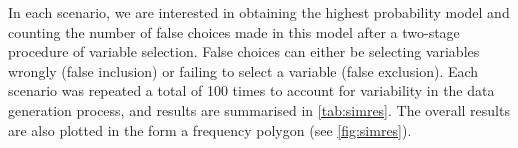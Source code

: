 \documentclass[a4paper,showframe,11pt]{report}
\begin{document}
In each scenario, we are interested in obtaining the highest probability model and counting the number of false choices made in this model after a two-stage procedure of variable selection.
False choices can either be selecting variables wrongly (false inclusion) or failing to select a variable (false exclusion).
Each scenario was repeated a total of 100 times to account for variability in the data generation process, and results are summarised in \cref{tab:simres}.
The overall results are also plotted in the form a frequency polygon (see \cref{fig:simres}).

\end{document}
